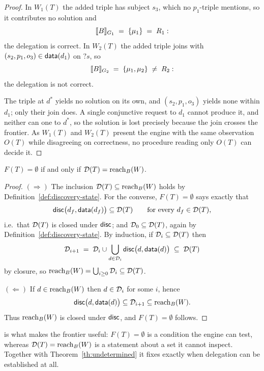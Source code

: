 \begin{proof}
  In $W_1(T)$ the added triple has subject $s_3$, which no $p_1$-triple mentions, so it
  contributes no solution and
  \[
    \llbracket B \rrbracket_{G_1} \;=\; \{\mu_1\} \;=\; R_1 :
  \]
  the delegation is correct. In $W_2(T)$ the added triple joins with
  $(s_2, p_1, o_3) \in \mathsf{data}(d_1)$ on $?s$, so
  \[
    \llbracket B \rrbracket_{G_2} \;=\; \{\mu_1, \mu_2\} \;\neq\; R_2 :
  \]
  the delegation is not correct.

  The triple at $d^{*}$ yields no solution on its own, and $(s_2, p_1, o_3)$ yields none
  within $d_1$; only their join does. A single conjunctive request to $d_1$ cannot produce
  it, and neither can one to $d^{*}$, so the solution is lost precisely because the join
  crosses the frontier. As $W_1(T)$ and $W_2(T)$ present the engine with the same
  observation $O(T)$ while disagreeing on correctness, no procedure reading only $O(T)$
  can decide it.
\end{proof}


\begin{lemma}
  \label{lem:frontier}
  $F(T) = \emptyset$ if and only if $\mathcal{D}(T) = \mathrm{reach}_B(W)$.
\end{lemma}

\begin{proof}
  $(\Rightarrow)$ The inclusion $\mathcal{D}(T) \subseteq \mathrm{reach}_B(W)$ holds by
  Definition~\ref{def:discovery-state}. For the converse, $F(T) = \emptyset$ says exactly
  that
  \[
    \mathsf{disc}\bigl(d_f, \mathsf{data}(d_f)\bigr) \subseteq \mathcal{D}(T)
    \qquad \text{for every } d_f \in \mathcal{D}(T),
  \]
  i.e.\ that $\mathcal{D}(T)$ is closed under $\mathsf{disc}$; and $\mathcal{D}_0 \subseteq \mathcal{D}(T)$,
  again by Definition~\ref{def:discovery-state}. By induction, if
  $\mathcal{D}_i \subseteq \mathcal{D}(T)$ then
  \[
    \mathcal{D}_{i+1} \;=\; \mathcal{D}_i \cup \bigcup_{d \in \mathcal{D}_i} \mathsf{disc}\bigl(d, \mathsf{data}(d)\bigr)
    \;\subseteq\; \mathcal{D}(T)
  \]
  by closure, so $\mathrm{reach}_B(W) = \bigcup_{i \geq 0} \mathcal{D}_i \subseteq \mathcal{D}(T)$.

  $(\Leftarrow)$ If $d \in \mathrm{reach}_B(W)$ then $d \in \mathcal{D}_i$ for some $i$, hence
  \[
    \mathsf{disc}\bigl(d, \mathsf{data}(d)\bigr) \subseteq \mathcal{D}_{i+1} \subseteq \mathrm{reach}_B(W).
  \]
  Thus $\mathrm{reach}_B(W)$ is closed under $\mathsf{disc}$, and $F(T) = \emptyset$ follows.
\end{proof}

is what makes the frontier useful: $F(T) = \emptyset$ is a
condition the engine can test, whereas $\mathcal{D}(T) = \mathrm{reach}_B(W)$ is a statement about a
set it cannot inspect. Together with Theorem~\ref{th:undetermined} it fixes exactly when
delegation can be established at all.

